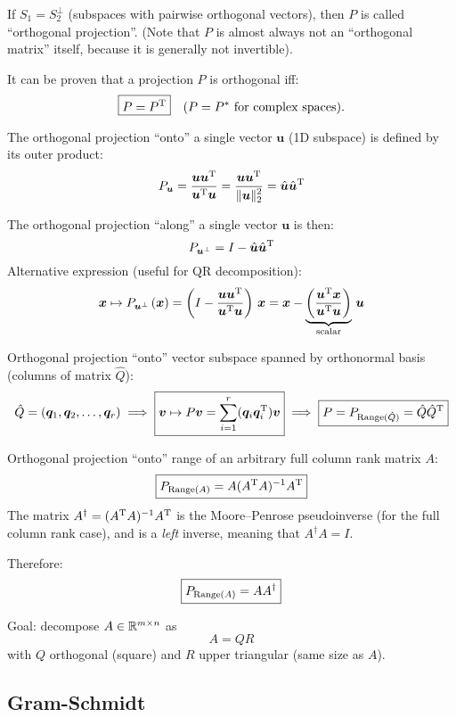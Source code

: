 \documentclass[
  12pt,
  paper=a4,
]{scrartcl} %
\begin{document}
If $S_1 = S_2^\perp$ (subspaces with pairwise orthogonal vectors), then $P$ is called ``orthogonal projection''. (Note that $P$ is almost always not an ``orthogonal matrix'' itself, because it is generally not invertible).

It can be proven that a projection $P$ is orthogonal iff:
\[\boxed{P = P^{\mathrm{T}}} \quad (P = P^*\text{ for complex spaces).}\]

The orthogonal projection ``onto'' a single vector $\bm u$ (1D subspace) is defined by its outer product:
\[
P_{\bm u} = 
\frac{\bm u \bm u^{\mathrm{T}}}{\bm u^{\mathrm{T}}\bm u}
= \frac{\bm u \bm u^{\mathrm{T}}}{\displaystyle\|\bm u\|_2^2} =
    \hat{\bm u} \hat{\bm u}^{\mathrm{T}}
\]

The orthogonal projection ``along'' a single vector $\bm u$ is then:
\[
P_{\bm u^\perp} = I - \hat{\bm u} \hat{\bm u}^{\mathrm{T}}
\]
Alternative expression (useful for QR decomposition):
\[
\bm x \mapsto
P_{\bm u^\perp}\, (\bm x)
=
    \left(
        I - \frac{\bm u \bm u^{\mathrm{T}}}{\bm u^{\mathrm{T}}\bm u}
    \right)\,\bm x
=
        \bm x - \underbrace{\left(
        \frac{\bm u^{\mathrm{T}} \bm x}{\bm u^{\mathrm{T}}\bm u}
        \right)}_{\text{scalar}}\, \bm u
\]

Orthogonal projection ``onto'' vector subspace spanned by orthonormal basis (columns of matrix $\hat{Q}$):
\[ 
\hat Q = (\bm q_1, \bm q_2, \dots, \bm q_r) \implies
\boxed{
    \bm v \mapsto P \bm v= \sum_{i=1}^r (\bm q_i \bm q_i ^{\mathrm{T}}) \bm v
}\implies 
\boxed{
    P = P_{\operatorname{Range}(\hat Q)} = \hat Q \hat Q^{\mathrm{T}}
}
\]

Orthogonal projection ``onto'' range of an arbitrary full column rank matrix $A$:
\[
\boxed{
    P_{\operatorname{Range}(A)} = A (A^{\mathrm{T}} A)^{-1} A^{\mathrm{T}}
}
\]
The matrix $A^\dagger = (A^{\mathrm{T}} A)^{-1} A^{\mathrm{T}}$ is the Moore–Penrose pseudoinverse (for the full column rank case), and is a \emph{left} inverse, meaning that $A^\dagger A = I$.

Therefore: \[ 
\boxed{
    P_{\operatorname{Range}(A)}
    = A A^\dagger
}\]


Goal: decompose $A\in\mathbb R^{m\times n }$ as
\[
    A = QR
\]
with $Q$ orthogonal (square) and $R$ upper triangular (same size as $A$).

\subsection*{Gram-Schmidt}

\end{document}
